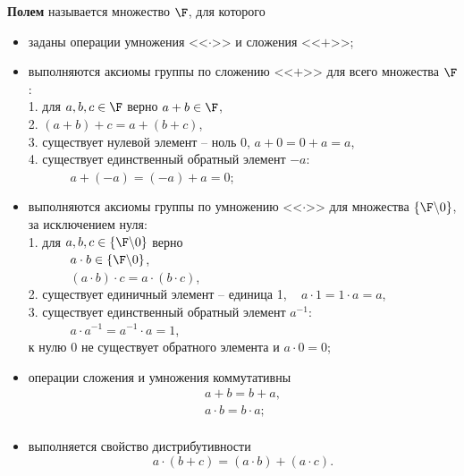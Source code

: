 \textbf{Полем} называется множество $\F$, для которого
\begin{itemize}
    \item заданы операции умножения <<$\cdot$>> и сложения <<$+$>>;
    \item выполняются аксиомы группы по сложению <<$+$>> для всего множества $\F$: \\
        1. для $a,b,c \in \F$ верно $a+b \in \F$, \\
        2. $(a+b)+c = a+(b+c)$, \\
        3. существует нулевой элемент -- ноль 0, $a+0=0+a=a$, \\
        4. существует единственный обратный элемент $-a$: \\
        \indent \indent \indent ~~~~~~ $a + (-a) = (-a) + a = 0$;
    \item выполняются аксиомы группы по умножению <<$\cdot$>> для множества $\{ \F \backslash 0 \}$, за исключением нуля: \\
        1. для $a,b,c \in \{ \F \backslash 0 \}$ верно \\
        \indent \indent \indent ~~~~~~ $a \cdot b \in \{ \F \backslash 0 \}$, \\
        \indent \indent \indent ~~~~~~ $(a \cdot b) \cdot c = a \cdot (b \cdot c)$, \\
        2. существует единичный элемент -- единица 1, ~ $a \cdot 1 = 1 \cdot a = a$, \\
        3. существует единственный обратный элемент $a^{-1}:$ \\
        \indent \indent \indent ~~~~~~ $a \cdot a^{-1} = a^{-1} \cdot a = 1$, \\
        к нулю 0 не существует обратного элемента и $a \cdot 0 = 0$;
    \item операции сложения и умножения коммутативны
        \[ \begin{array}{l}
            a + b = b + a, \\
            a \cdot b = b \cdot a; \\
        \end{array} \]
    \item выполняется свойство дистрибутивности
        \[ a \cdot (b + c) = (a \cdot b) + (a \cdot c). \]
\end{itemize}

